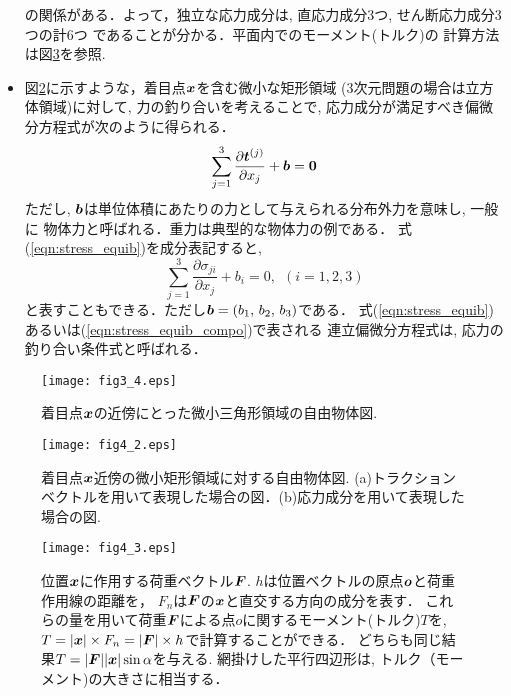 \documentclass[10pt,a4j]{jbook}
\begin{document}
\begin{itemize}
	の関係がある．よって，独立な応力成分は, 直応力成分3つ, せん断応力成分3つの計6つ
	であることが分かる．平面内でのモーメント(トルク)の
	計算方法は図\ref{fig:fig4_2}を参照.
\item
	図\ref{fig:fig4_1}に示すような，着目点$\mbox{\boldmath $x$}$を含む微小な矩形領域
	(3次元問題の場合は立方体領域)に対して, 力の釣り合いを考えることで, 
	応力成分が満足すべき偏微分方程式が次のように得られる．
	\begin{equation}
		\sum_{j=1}^3 \frac{\partial \mbox{\boldmath $t$}^{(j)}}{\partial x_j}+\mbox{\boldmath $b$}=\mbox{\boldmath $0$}
		\label{eqn:stress_equib}
	\end{equation}
	ただし, $\mbox{\boldmath $b$}$は単位体積にあたりの力として与えられる分布外力を意味し, 一般に
	物体力と呼ばれる．重力は典型的な物体力の例である．
	式(\ref{eqn:stress_equib})を成分表記すると, 
	\begin{equation}
		\sum_{j=1}^3 \frac{\partial \sigma_{ji}}{\partial x_j}+b_i=0, \ \ (i=1,2,3)
		\label{eqn:stress_equib_compo}
	\end{equation}
	と表すこともできる．ただし$\mbox{\boldmath $b$}=(b_1,\,b_2,\, b_3)$である．
	式(\ref{eqn:stress_equib})あるいは(\ref{eqn:stress_equib_compo})で表される
	連立偏微分方程式は, 応力の釣り合い条件式と呼ばれる．
\end{itemize}
\begin{figure}[h]
	\begin{center}
	\texttt{[image: fig3\_4.eps]} 
	\end{center}
	\caption{着目点$\mbox{\boldmath $x$}$の近傍にとった微小三角形領域の自由物体図.}
	\label{fig:fig3_4}
\end{figure}
\begin{figure}[h]
	\begin{center}
	\texttt{[image: fig4\_2.eps]} 
	\end{center}
	\caption{着目点$\mbox{\boldmath $x$}$近傍の微小矩形領域に対する自由物体図.
	(a)トラクションベクトルを用いて表現した場合の図．(b)応力成分を用いて表現した場合の図.} 
	\label{fig:fig4_1}
\end{figure}
\begin{figure}[h]
	\begin{center}
	\texttt{[image: fig4\_3.eps]} 
	\end{center}
	\caption{
	位置$\mbox{\boldmath $x$}$に作用する荷重ベクトル$\mbox{\boldmath $F$}$.
	$h$は位置ベクトルの原点$\mbox{\boldmath $o$}$と荷重作用線の距離を，
	$F_n$は$\mbox{\boldmath $F$}$の$\mbox{\boldmath $x$}$と直交する方向の成分を表す．
	これらの量を用いて荷重$\mbox{\boldmath $F$}$による点$o$に関するモーメント(トルク)$T$を,
	$T=|\mbox{\boldmath $x$}|\times F_n=|\mbox{\boldmath $F$}|\times h$で計算することができる．
	どちらも同じ結果$T=|\mbox{\boldmath $F$}| |\mbox{\boldmath $x$}|\sin\alpha$を与える.
	網掛けした平行四辺形は, トルク（モーメント)の大きさに相当する．
	 } 
	\label{fig:fig4_2}
\end{figure}
\end{document}
